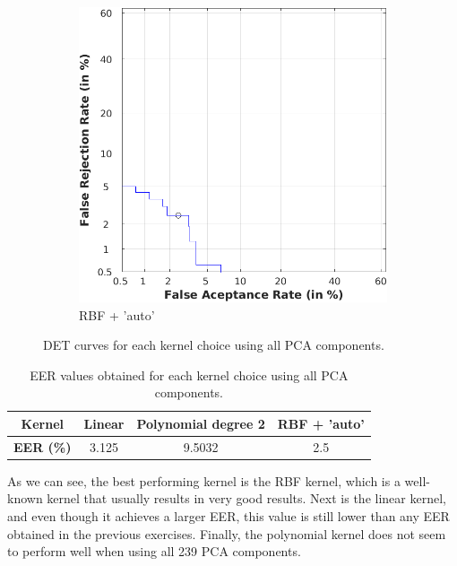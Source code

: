 \documentclass[11pt]{article}
\begin{document}
\begin{figure}[h!]
     ~\vspace{1.5em}

     \begin{subfigure}[t]{0.4\textwidth}
         \centering
         \includegraphics[scale=0.45]{img/3a_rbf_det}
         \caption{RBF + 'auto'}
     \end{subfigure}
    \caption{DET curves for each kernel choice using all PCA components.}
    \label{fig:ex3a}
\end{figure}

\begin{table}[h!]
  \centering
  \begin{tabular}{c|ccc}
    \textbf{Kernel} & Linear & Polynomial degree 2 & RBF + 'auto'\\
    \hline
    \textbf{EER (\%)} & 3.125 & 9.5032 & {\color{red}2.5}\\
  \end{tabular}
  \caption{EER values obtained for each kernel choice using all PCA components.}
  \label{tab:ex3a}
\end{table}

As we can see, the best performing kernel is the RBF kernel, which is a well-known kernel that usually results in very good results. Next is the linear kernel, and even though it achieves a larger EER, this value is still lower than any EER obtained in the previous exercises. Finally, the polynomial kernel does not seem to perform well when using all 239 PCA components.
\end{document}
